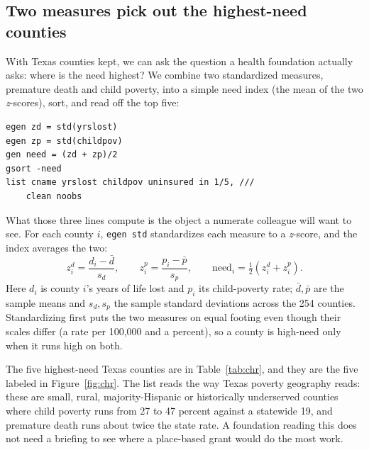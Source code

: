 \documentclass[
    a4paper,
    fontsize=10pt,
    twoside=true,
    numbers=noenddot,
]{kaobook}
\begin{document}
\subsection{Two measures pick out the highest-need counties}\label{sec:ch04-needindex}
With Texas counties kept, we can ask the question a health foundation actually asks: where is the need highest? We combine two standardized measures, premature death and child poverty, into a simple need index (the mean of the two \emph{z}-scores), sort, and read off the top five:
\par
{\footnotesize
\begin{verbatim}
egen zd = std(yrslost)
egen zp = std(childpov)
gen need = (zd + zp)/2
gsort -need
list cname yrslost childpov uninsured in 1/5, ///
    clean noobs
\end{verbatim}
}
What those three lines compute is the object a numerate colleague will
want to see. For each county $i$, \texttt{egen std} standardizes each
measure to a \emph{z}-score, and the index averages the two:
\[
z^{d}_i=\frac{d_i-\bar d}{s_d},\qquad
z^{p}_i=\frac{p_i-\bar p}{s_p},\qquad
\text{need}_i=\tfrac{1}{2}\!\left(z^{d}_i+z^{p}_i\right).
\]
Here $d_i$ is county $i$'s years of life lost and $p_i$ its child-poverty
rate; $\bar d,\bar p$ are the sample means and $s_d,s_p$ the sample
standard deviations across the 254 counties. Standardizing first puts the two
measures on equal footing even though their scales differ (a rate per
100{,}000 and a percent), so a county is high-need only when it runs
high on both.

The five highest-need Texas counties are in Table~\ref{tab:chr}, and they are the five labeled in Figure~\ref{fig:chr}. The list reads the way Texas poverty geography reads: these are small, rural, majority-Hispanic or historically underserved counties where child poverty runs from 27 to 47 percent against a statewide 19, and premature death runs about twice the state rate. A foundation reading this does not need a briefing to see where a place-based grant would do the most work.
\end{document}
